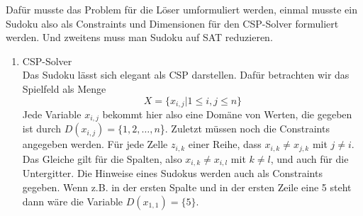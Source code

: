 Dafür musste das Problem für die Löser umformuliert werden, einmal musste ein Sudoku also als Constraints und Dimensionen für den CSP-Solver formuliert werden.
Und zweitens muss man Sudoku auf SAT reduzieren.

\begin{enumerate}
    \item CSP-Solver \\
    Das Sudoku lässt sich elegant als CSP darstellen.
    Dafür betrachten wir das Spielfeld als Menge
    $$
    X = \{x_{i,j}|1 \leq i,j \leq n\}
    $$
    Jede Variable $x_{i,j}$ bekommt hier also eine Domäne von Werten, die gegeben ist durch $D(x_{i,j}) = \{1, 2, \dots, n$\}.
    Zuletzt müssen noch die Constraints angegeben werden.
    Für jede Zelle $z_{i, k}$ einer Reihe, dass $x_{i, k} \neq x_{j, k}$ mit $j \neq i$.
    Das Gleiche gilt für die Spalten, also $x_{i, k} \neq x_{i, l}$ mit $k \neq l$, und auch für die Untergitter.
    Die Hinweise eines Sudokus werden auch als Constraints gegeben.
    Wenn z.B. in der ersten Spalte und in der ersten Zeile eine 5 steht dann wäre die Variable $D(x_{1, 1}) = \{5\}$.



\end{enumerate}
